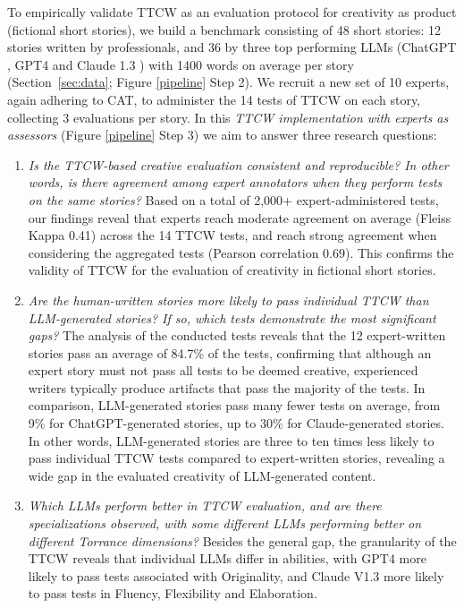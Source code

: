 To empirically validate TTCW as an evaluation protocol for creativity as product (fictional short stories), we build a benchmark consisting of 48 short stories: 12 stories written by professionals, and 36 by three top performing LLMs (ChatGPT \cite{ChatGPT}, GPT4 \cite{OpenAI2023GPT4TR} and Claude 1.3 \cite{Claude}) with 1400 words on average per story (Section~\ref{sec:data}; Figure \ref{pipeline} Step 2). %
We recruit a new set of 10 experts, again adhering to CAT, to administer the 14 tests of TTCW on each story, collecting 3 evaluations per story. In this \textit{TTCW implementation with experts as assessors} (Figure \ref{pipeline} Step 3) %
we aim to answer three research questions: 
\begin{enumerate}[label=RQ\arabic*:,leftmargin=3em]
     \item \textit{Is the TTCW-based creative evaluation consistent and reproducible? In other words, is there agreement among expert annotators when they perform tests on the same stories?} Based on a total of 2,000+ expert-administered tests, our findings reveal that experts reach moderate agreement on average (Fleiss Kappa 0.41) across the 14 TTCW tests, and reach strong agreement when considering the aggregated tests (Pearson correlation $0.69$). This confirms the validity of TTCW for the evaluation of creativity in fictional short stories.\\
     
    \item \textit{Are the human-written stories more likely to pass individual TTCW than LLM-generated stories? If so, which tests demonstrate the most significant gaps?} The analysis of the conducted tests reveals that the 12 expert-written stories pass an average of 84.7\% of the tests, confirming that although an expert story must not pass all tests to be deemed creative, experienced writers typically produce artifacts that pass the majority of the tests. In comparison, LLM-generated stories pass many fewer tests on average, from 9\% for ChatGPT-generated stories, up to 30\% for Claude-generated stories. In other words, LLM-generated stories are three to ten times less likely to pass individual TTCW tests compared to expert-written stories, revealing a wide gap in the evaluated creativity of LLM-generated content.\\ 
    
    \item \textit{Which LLMs perform better in TTCW evaluation, and are there specializations observed, with some different LLMs performing better on different Torrance dimensions?} Besides the general gap, the granularity of the TTCW reveals that individual LLMs differ in abilities, with GPT4 more likely to pass tests associated with Originality, and Claude V1.3 more likely to pass tests in Fluency, Flexibility and Elaboration.
\end{enumerate}


